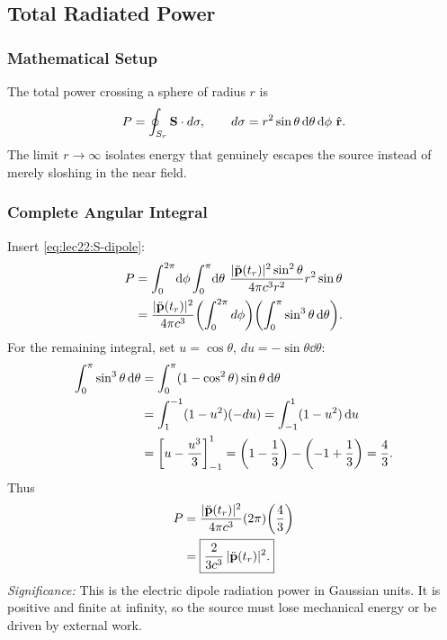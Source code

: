 \subsection{Total Radiated Power}
\label{subsec:lec22:total-power}

\subsubsection*{Mathematical Setup}
The total power crossing a sphere of radius $r$ is
\begin{equation}\label{eq:lec22:power-surface}
  P = \oint_{S_r} \mathbf{S}\cdot d\mathbf{\sigma},
  \qquad d\mathbf{\sigma}=r^2\sin\theta\dd{\theta}\dd{\phi}\,\hat{\mathbf{r}}.
\end{equation}
The limit $r\to\infty$ isolates energy that genuinely escapes the source instead of
merely sloshing in the near field.

\subsubsection*{Complete Angular Integral}
Insert \eqref{eq:lec22:S-dipole}:
\begin{align}
  P
  &= \int_0^{2\pi}\!\dd{\phi}\int_0^\pi\!\dd{\theta}\,
     \frac{|\ddot{\mathbf{p}}(t_r)|^2\sin^2\theta}{4\pi c^3 r^2}
     r^2\sin\theta \notag\\
  &= \frac{|\ddot{\mathbf{p}}(t_r)|^2}{4\pi c^3}
     \qty(\int_0^{2\pi}d\phi)
     \qty(\int_0^\pi \sin^3\theta\dd{\theta}).
  \label{eq:lec22:power-before-integral}
\end{align}
For the remaining integral, set $u=\cos\theta$, $du=-\sin\theta\dd{\theta}$:
\begin{align}
  \int_0^\pi \sin^3\theta\dd{\theta}
  &= \int_0^\pi (1-\cos^2\theta)\sin\theta\dd{\theta} \notag\\
  &= \int_{1}^{-1} (1-u^2)(-du)
   = \int_{-1}^{1}(1-u^2)\dd{u} \notag\\
  &= \qty[u-\frac{u^3}{3}]_{-1}^{1}
   = \qty(1-\frac13)-\qty(-1+\frac13)
   = \frac{4}{3}.
  \label{eq:lec22:sin3-integral}
\end{align}
Thus
\begin{align}
  P
  &= \frac{|\ddot{\mathbf{p}}(t_r)|^2}{4\pi c^3}
     \qty(2\pi)\qty(\frac{4}{3}) \notag\\
  &= \boxed{\frac{2}{3c^3}\,|\ddot{\mathbf{p}}(t_r)|^2.}
  \label{eq:lec22:dipole-power}
\end{align}
\textit{Significance:} This is the electric dipole radiation power in Gaussian units.
It is positive and finite at infinity, so the source must lose mechanical energy or be
driven by external work.

